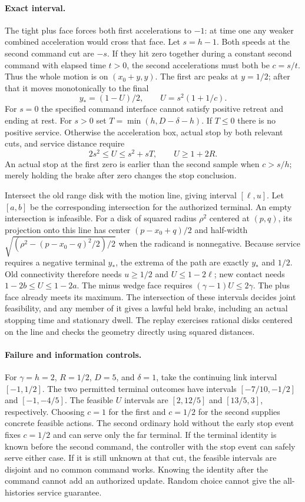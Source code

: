 \documentclass{article}
\begin{document}
\paragraph{Exact interval.}
The tight plus face forces both first accelerations to \(-1\): at time one any weaker combined acceleration would cross that face. Let \(s=h-1\). Both speeds at the second command cut are \(-s\). If they hit zero together during a constant second command with elapsed time \(t>0\), the second accelerations must both be \(c=s/t\). Thus the whole motion is on \((x_0+y,y)\). The first arc peaks at \(y=1/2\); after that it moves monotonically to the final
\[
 y_*=(1-U)/2,\qquad U=s^2(1+1/c).
\]
For \(s=0\) the specified command interface cannot satisfy positive retreat and ending at rest. For \(s>0\) set \(T=\min(h,D-\delta-h)\). If \(T\le0\) there is no positive service. Otherwise the acceleration box, actual stop by both relevant cuts, and service distance require
\[
  2s^2\le U\le s^2+sT,\qquad U\ge1+2R.
\]
An actual stop at the first zero is earlier than the second sample when \(c>s/h\); merely holding the brake after zero changes the stop conclusion.

Intersect the old range disk with the motion line, giving interval \([\ell,u]\). Let \([a,b]\) be the corresponding intersection for the authorized terminal. An empty intersection is infeasible. For a disk of squared radius \(\rho^2\) centered at \((p,q)\), its projection onto this line has center \((p-x_0+q)/2\) and half-width \(\sqrt{(\rho^2-(p-x_0-q)^2/2)/2}\) when the radicand is nonnegative. Because service requires a negative terminal \(y_*\), the extrema of the path are exactly \(y_*\) and \(1/2\). Old connectivity therefore needs \(u\ge1/2\) and \(U\le1-2\ell\); new contact needs \(1-2b\le U\le1-2a\). The minus wedge face requires \((\gamma-1)U\le2\gamma\). The plus face already meets its maximum. The intersection of these intervals decides joint feasibility, and any member of it gives a lawful held brake, including an actual stopping time and stationary dwell. The replay exercises rational disks centered on the line and checks the geometry directly using squared distances.

\paragraph{Failure and information controls.}
For \(\gamma=h=2\), \(R=1/2\), \(D=5\), and \(\delta=1\), take the continuing link interval \([-1,1/2]\). The two permitted terminal outcomes have intervals \([-7/10,-1/2]\) and \([-1,-4/5]\). The feasible \(U\) intervals are \([2,12/5]\) and \([13/5,3]\), respectively. Choosing \(c=1\) for the first and \(c=1/2\) for the second supplies concrete feasible actions. The second ordinary hold without the early stop event fixes \(c=1/2\) and can serve only the far terminal. If the terminal identity is known before the second command, the controller with the stop event can safely serve either case. If it is still unknown at that cut, the feasible intervals are disjoint and no common command works. Knowing the identity after the command cannot add an authorized update. Random choice cannot give the all-histories service guarantee.
\end{document}
